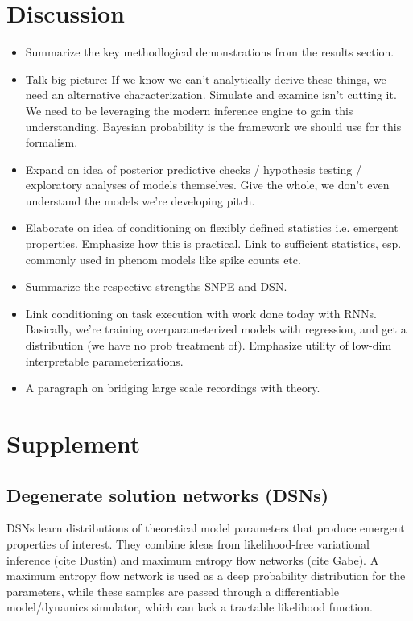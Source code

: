 \documentclass[11pt]{article}
\begin{document}
\section{Discussion}
\begin{itemize}
\item Summarize the key methodlogical demonstrations from the results section.
\item Talk big picture: If we know we can't analytically derive these things, we need an alternative characterization.  Simulate and examine isn't cutting it.  We need to be leveraging the modern inference engine to gain this understanding.  Bayesian probability is the framework we should use for this formalism.
\item Expand on idea of posterior predictive checks / hypothesis testing / exploratory analyses of models themselves.  Give the whole, we don't even understand the models we're developing pitch.
\item Elaborate on idea of conditioning on flexibly defined statistics i.e. emergent properties. Emphasize how this is practical.  Link to sufficient statistics, esp. commonly used in phenom models like spike counts etc.
\item Summarize the respective strengths SNPE and DSN.
\item Link conditioning on task execution with work done today with RNNs.  Basically, we're training overparameterized models with regression, and get a distribution (we have no prob treatment of). Emphasize utility of low-dim interpretable parameterizations.
\item A paragraph on bridging large scale recordings with theory.
\end{itemize}





\appendix

\section{Supplement}

\subsection{Degenerate solution networks (DSNs)}
DSNs learn distributions of theoretical model parameters that produce emergent properties of interest.  They combine ideas from likelihood-free variational inference (cite Dustin) and maximum entropy flow networks (cite Gabe).  A maximum entropy flow network is used as a deep probability distribution for the parameters, while these samples are passed through a differentiable model/dynamics simulator, which can lack a tractable likelihood function.
\end{document}

